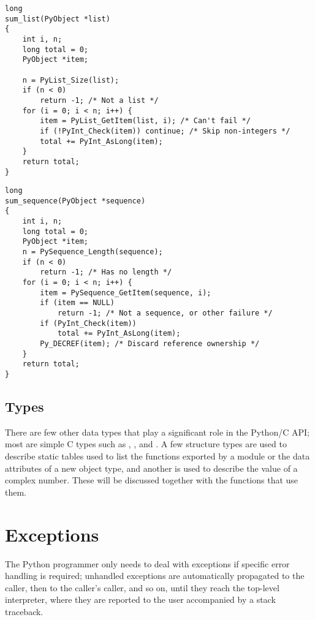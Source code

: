 \begin{verbatim}
long
sum_list(PyObject *list)
{
    int i, n;
    long total = 0;
    PyObject *item;

    n = PyList_Size(list);
    if (n < 0)
        return -1; /* Not a list */
    for (i = 0; i < n; i++) {
        item = PyList_GetItem(list, i); /* Can't fail */
        if (!PyInt_Check(item)) continue; /* Skip non-integers */
        total += PyInt_AsLong(item);
    }
    return total;
}
\end{verbatim}

\begin{verbatim}
long
sum_sequence(PyObject *sequence)
{
    int i, n;
    long total = 0;
    PyObject *item;
    n = PySequence_Length(sequence);
    if (n < 0)
        return -1; /* Has no length */
    for (i = 0; i < n; i++) {
        item = PySequence_GetItem(sequence, i);
        if (item == NULL)
            return -1; /* Not a sequence, or other failure */
        if (PyInt_Check(item))
            total += PyInt_AsLong(item);
        Py_DECREF(item); /* Discard reference ownership */
    }
    return total;
}
\end{verbatim}


\subsection{Types \label{types}}

There are few other data types that play a significant role in 
the Python/C API; most are simple C types such as , 
,  and .  A few structure types 
are used to describe static tables used to list the functions exported 
by a module or the data attributes of a new object type, and another
is used to describe the value of a complex number.  These will 
be discussed together with the functions that use them.


\section{Exceptions \label{exceptions}}

The Python programmer only needs to deal with exceptions if specific 
error handling is required; unhandled exceptions are automatically 
propagated to the caller, then to the caller's caller, and so on, until
they reach the top-level interpreter, where they are reported to the 
user accompanied by a stack traceback.

